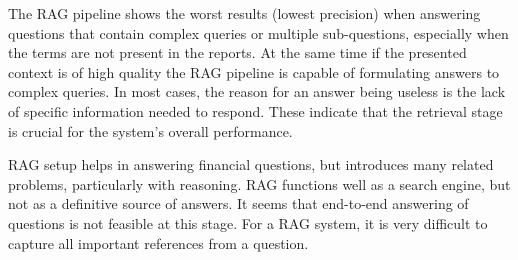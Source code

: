 The RAG pipeline shows the worst results (lowest precision) when answering questions that contain complex queries or multiple sub-questions, especially when the terms are not present in the reports. At the same time if the presented context is of high quality the RAG pipeline is capable of formulating answers to complex queries. In most cases, the reason for an answer being useless is the lack of specific information needed to respond. These indicate that the retrieval stage is crucial for the system's overall performance.

RAG setup helps in answering financial questions, but introduces many related problems, particularly with reasoning. RAG functions well as a search engine, but not as a definitive source of answers. It seems that end-to-end answering of questions is not feasible at this stage. For a RAG system, it is very difficult to capture all important references from a question.